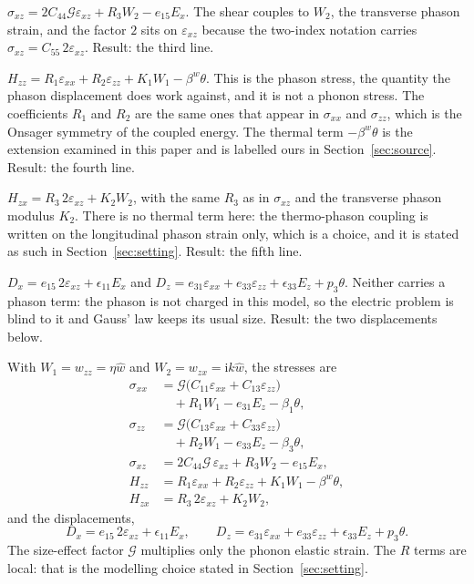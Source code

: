 \documentclass[11pt]{article}
\makeatletter
\newif\ifshowworked
\newenvironment{worked}{%
  \ifshowworked\par\smallskip\noindent\textit{Working.}\par\smallskip\else
  \setbox\z@\vbox\bgroup\fi}{\ifshowworked\par\smallskip\else\egroup\fi}
\newcommand{\ii}{\mathrm{i}}
\newcommand{\Gcal}{\mathcal{G}}
\makeatother
\begin{document}
\begin{worked}
$\sigma_{xz}=2C_{44}\Gcal\varepsilon_{xz}+R_3W_2-e_{15}E_x$. The shear couples to $W_2$, the transverse
phason strain, and the factor $2$ sits on $\varepsilon_{xz}$ because the two-index notation carries
$\sigma_{xz}=C_{55}\,2\varepsilon_{xz}$. Result: the third line.
\end{worked}

\begin{worked}
$H_{zz}=R_1\varepsilon_{xx}+R_2\varepsilon_{zz}+K_1W_1-\beta^{w}\theta$. This is the phason stress, the
quantity the phason displacement does work against, and it is not a phonon stress. The coefficients $R_1$
and $R_2$ are the same ones that appear in $\sigma_{xx}$ and $\sigma_{zz}$, which is the Onsager symmetry
of the coupled energy. The thermal term $-\beta^{w}\theta$ is the extension examined in this paper and is
labelled ours in Section~\ref{sec:source}. Result: the fourth line.
\end{worked}

\begin{worked}
$H_{zx}=R_3\,2\varepsilon_{xz}+K_2W_2$, with the same $R_3$ as in $\sigma_{xz}$ and the transverse phason
modulus $K_2$. There is no thermal term here: the thermo-phason coupling is written on the longitudinal
phason strain only, which is a choice, and it is stated as such in Section~\ref{sec:setting}. Result: the
fifth line.
\end{worked}

\begin{worked}
$D_x=e_{15}\,2\varepsilon_{xz}+\epsilon_{11}E_x$ and
$D_z=e_{31}\varepsilon_{xx}+e_{33}\varepsilon_{zz}+\epsilon_{33}E_z+p_3\theta$. Neither carries a phason
term: the phason is not charged in this model, so the electric problem is blind to it and Gauss' law keeps
its usual size. Result: the two displacements below.
\end{worked}

With $W_1=w_{zz}=\eta\hat w$ and $W_2=w_{zx}=\ii k\hat w$, the stresses are
\begin{align}
\sigma_{xx}&=\Gcal\bigl(C_{11}\varepsilon_{xx}+C_{13}\varepsilon_{zz}\bigr)\\
&\quad +R_1W_1-e_{31}E_z-\beta_1\theta,\\
\sigma_{zz}&=\Gcal\bigl(C_{13}\varepsilon_{xx}+C_{33}\varepsilon_{zz}\bigr)\\
&\quad +R_2W_1-e_{33}E_z-\beta_3\theta,\\
\sigma_{xz}&=2C_{44}\Gcal\,\varepsilon_{xz}+R_3W_2-e_{15}E_x,\\
H_{zz}&=R_1\varepsilon_{xx}+R_2\varepsilon_{zz}+K_1W_1-\beta^{w}\theta,\\
H_{zx}&=R_3\,2\varepsilon_{xz}+K_2W_2,
\end{align}
and the displacements,
\begin{equation}
D_x=e_{15}\,2\varepsilon_{xz}+\epsilon_{11}E_x,\qquad
D_z=e_{31}\varepsilon_{xx}+e_{33}\varepsilon_{zz}+\epsilon_{33}E_z+p_3\theta .
\end{equation}
The size-effect factor $\Gcal$ multiplies only the phonon elastic strain. The $R$ terms are local: that is
the modelling choice stated in Section~\ref{sec:setting}.
\end{document}
